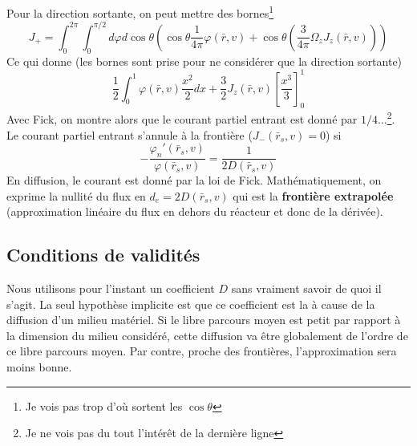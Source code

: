 Pour la direction sortante, on peut mettre des bornes\footnote{Je vois pas trop d'où sortent les $\cos\theta$}
\begin{equation}
J_+ = \int_0^{2\pi} \int_0^{\pi/2} d\varphi d\cos\theta \left(\cos\theta\frac{1}{4\pi} \varphi(\bar r,v) + \cos\theta\left(\frac{3}{4\pi}\Omega_z J_z(\bar r,v)\right)\right)
\end{equation}
Ce qui donne (les bornes sont prise pour ne considérer que la direction sortante)
\begin{equation}
\frac{1}{2}\int_0^1 \varphi(\bar r,v) \dfrac{x^2}{2}dx  + \frac{3}{2}J_z(\bar r,v)\left[
\frac{x^3}{3}\right]_0^1
\end{equation}
Avec Fick, on montre alors que le courant partiel entrant est donné par $1/4\dots$\footnote{Je ne 
vois pas du tout l'intérêt de la dernière ligne}.\\

Le courant partiel entrant s'annule à la frontière (${J_ - }({\bar r_s},v) = 0$) si 
\begin{equation}
 - \frac{{{\varphi _n}'({{\bar r}_s},v)}}{{\varphi ({{\bar r}_s},v)}} = \frac{1}{{2D({{\bar r}_s},v)}}
\end{equation}
En diffusion, le courant est donné par la loi de Fick. Mathématiquement, on exprime la nullité du flux
en $d_e = 2D(\bar r_s, v)$ qui est la \textbf{frontière extrapolée} (approximation linéaire du flux 
en dehors du réacteur et donc de la dérivée).


\subsection{Conditions de validités}
Nous utilisons pour l'instant un coefficient $D$ sans vraiment savoir de quoi il s'agit. La seul 
hypothèse implicite est que ce coefficient est la à cause de la diffusion d'un milieu matériel. Si 
le libre parcours moyen est petit par rapport à la dimension du milieu considéré, cette diffusion 
va être globalement de l'ordre de ce libre parcours moyen.  Par contre, proche des frontières, 
l'approximation sera moins bonne.



